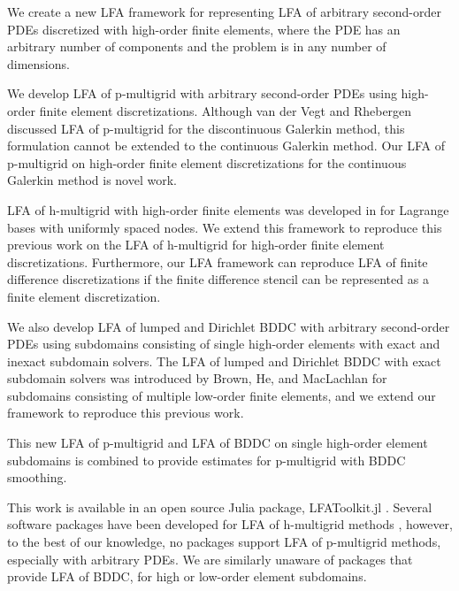 We create a new LFA framework for representing LFA of arbitrary second-order PDEs discretized with high-order finite elements, where the PDE has an arbitrary number of components and the problem is in any number of dimensions.

We develop LFA of p-multigrid with arbitrary second-order PDEs using high-order finite element discretizations.
Although van der Vegt and Rhebergen \cite{van2011discrete} discussed LFA of p-multigrid for the discontinuous Galerkin method, this formulation cannot be extended to the continuous Galerkin method.
Our LFA of p-multigrid on high-order finite element discretizations for the continuous Galerkin method is novel work.

LFA of h-multigrid with high-order finite elements was developed in \cite{he2020two} for Lagrange bases with uniformly spaced nodes.
We extend this framework to reproduce this previous work on the LFA of h-multigrid for high-order finite element discretizations.
Furthermore, our LFA framework can reproduce LFA of finite difference discretizations if the finite difference stencil can be represented as a finite element discretization.

We also develop LFA of lumped and Dirichlet BDDC with arbitrary second-order PDEs using subdomains consisting of single high-order elements with exact and inexact subdomain solvers.
The LFA of lumped and Dirichlet BDDC with exact subdomain solvers was introduced by Brown, He, and MacLachlan \cite{brown2019local} for subdomains consisting of multiple low-order finite elements, and we extend our framework to reproduce this previous work.

This new LFA of p-multigrid and LFA of BDDC on single high-order element subdomains is combined to provide estimates for p-multigrid with BDDC smoothing.

This work is available in an open source Julia package, LFAToolkit.jl \cite{thompson2021toolkit}.
Several software packages have been developed for LFA of h-multigrid methods \cite{rittich2018extending,kahl2020automated,wienands2004practical}, however, to the best of our knowledge, no packages support LFA of p-multigrid methods, especially with arbitrary PDEs.
We are similarly unaware of packages that provide LFA of BDDC, for high or low-order element subdomains.
